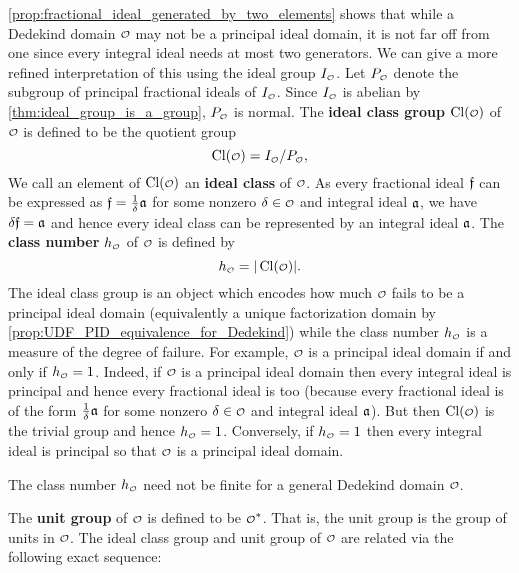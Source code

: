     \cref{prop:fractional_ideal_generated_by_two_elements} shows that while a Dedekind domain $\smc{O}$ may not be a principal ideal domain, it is not far off from one since every integral ideal needs at most two generators. We can give a more refined interpretation of this using the ideal group $I_{\smc{O}}$. Let $P_{\smc{O}}$ denote the subgroup of principal fractional ideals of $I_{\smc{O}}$. Since $I_{\smc{O}}$ is abelian by \cref{thm:ideal_group_is_a_group}, $P_{\smc{O}}$ is normal. The \textbf{ideal class group} $\Cl(\smc{O})$ of $\smc{O}$ is defined to be the quotient group
    \[
      \Cl(\smc{O}) = I_{\smc{O}}/P_{\smc{O}},
    \]
    We call an element of $\Cl(\smc{O})$ an \textbf{ideal class} of $\smc{O}$. As every fractional ideal $\mathfrak{f}$ can be expressed as $\mathfrak{f} = \frac{1}{\delta}\mathfrak{a}$ for some nonzero $\d \in \smc{O}$ and integral ideal $\mathfrak{a}$, we have $\delta\mathfrak{f} = \mathfrak{a}$ and hence every ideal class can be represented by an integral ideal $\mathfrak{a}$. The \textbf{class number} $h_{\smc{O}}$ of $\smc{O}$ is defined by
    \[
      h_{\smc{O}} = |\Cl(\smc{O})|.
    \]
    The ideal class group is an object which encodes how much $\smc{O}$ fails to be a principal ideal domain (equivalently a unique factorization domain by \cref{prop:UDF_PID_equivalence_for_Dedekind}) while the class number $h_{\smc{O}}$ is a measure of the degree of failure. For example, $\smc{O}$ is a principal ideal domain if and only if $h_{\smc{O}} = 1$. Indeed, if $\smc{O}$ is a principal ideal domain then every integral ideal is principal and hence every fractional ideal is too (because every fractional ideal is of the form $\frac{1}{\delta}\mathfrak{a}$ for some nonzero $\d \in \smc{O}$ and integral ideal $\mathfrak{a}$). But then $\Cl(\smc{O})$ is the trivial group and hence $h_{\smc{O}} = 1$. Conversely, if $h_{\smc{O}} = 1$ then every integral ideal is principal so that $\smc{O}$ is a principal ideal domain.

    \begin{remark}\label{rem:general_class_number_not_finite}
      The class number $h_{\smc{O}}$ need not be finite for a general Dedekind domain $\smc{O}$.
    \end{remark}
    
    The \textbf{unit group} of $\smc{O}$ is defined to be $\smc{O}^{\ast}$. That is, the unit group is the group of units in $\smc{O}$. The ideal class group and unit group of $\smc{O}$ are related via the following exact sequence:

